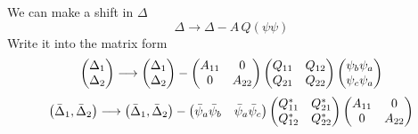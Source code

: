 We can make a shift in $\Delta$
\begin{equation}
\Delta\longrightarrow\Delta-A\,Q(\psi\psi)
\end{equation}
Write it into the matrix form
\begin{equation*}
\begin{pmatrix}\Delta_{1}\\\Delta_{2}\end{pmatrix}\longrightarrow
	\begin{pmatrix}\Delta_{1}\\\Delta_{2}\end{pmatrix}-\begin{pmatrix}A_{11}&0\\0&A_{22}\end{pmatrix}\begin{pmatrix}Q_{11}&Q_{12}\\Q_{21}&Q_{22}\end{pmatrix}
	\begin{pmatrix}\psi_{b}\psi_{a}\\\psi_{c}\psi_{a}\end{pmatrix}
\end{equation*}
\begin{equation*}
\begin{pmatrix}\bar\Delta_{1},\bar\Delta_{2}\end{pmatrix}\longrightarrow
	\begin{pmatrix}\bar\Delta_{1},\bar\Delta_{2}\end{pmatrix}-
	\begin{pmatrix}\bar\psi_{a}\bar\psi_{b}&\bar\psi_{a}\bar\psi_{c}\end{pmatrix}
	\begin{pmatrix}Q_{11}^{*}&Q_{21}^{*}\\Q_{12}^{*}&Q_{22}^{*}\end{pmatrix}\begin{pmatrix}A_{11}&0\\0&A_{22}\end{pmatrix}
\end{equation*}

